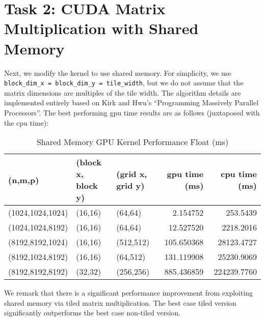 \documentclass{article}
\begin{document}
\section{Task 2: CUDA Matrix Multiplication with Shared Memory}
Next, we modify the kernel to use shared memory. For simplicity, 
we use \texttt{block\_dim\_x = block\_dim\_y = tile\_width}, but we do 
not assume that the matrix dimensions are multiples of the tile width. 
The algorithm details are implemented entirely based on Kirk and Hwu's 
``Programming Massively Parallel Processors''. The best performing gpu time 
results are as follows (juxtaposed with the cpu time):
\begin{table}[H]
    \centering
    \caption{Shared Memory GPU Kernel Performance Float (ms)}
    \fontsize{12}{14}\selectfont
    \begin{tabular}[t]{lllrr}
    \toprule
    (n,m,p) & (block x, block y) & (grid x, grid y) & gpu time (ms) & cpu time (ms)\\
    \midrule
    (1024,1024,1024) & (16,16) & (64,64) & 2.154752 & 253.5439\\
    (1024,1024,8192) & (16,16) & (64,64) & 12.527520 & 2218.2016\\
    (8192,8192,1024) & (16,16) & (512,512) & 105.650368 & 28123.4727\\
    (8192,1024,8192) & (16,16) & (64,512) & 131.119908 & 25230.9069\\
    (8192,8192,8192) & (32,32) & (256,256) & 885.436859 & 224239.7760\\
    \bottomrule
    \end{tabular}
\end{table}
\noindent We remark that there is a significant performance improvement from exploiting 
shared memory via tiled matrix multiplication. The best case tiled version 
significantly outperforms the best case non-tiled version.
\end{document}
